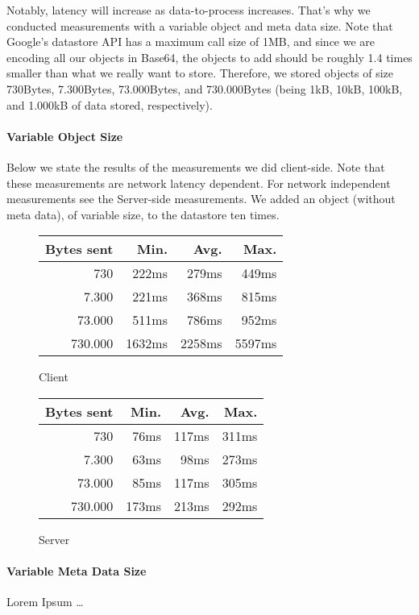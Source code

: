 Notably, latency will increase as data-to-process increases. That's why we
conducted measurements with a variable object and meta data size. Note that
Google's datastore API has a maximum call size of 1MB, and since we are
encoding all our objects in Base64, the objects to add should be roughly 1.4
times smaller than what we really want to store. Therefore, we stored objects 
of size 730Bytes, 7.300Bytes, 73.000Bytes, and 730.000Bytes (being 1kB, 10kB,
100kB, and 1.000kB of data stored, respectively).

\paragraph{Variable Object Size}
Below we state the results of the measurements we did client-side. Note that
these measurements are network latency dependent. For network independent
measurements see the Server-side measurements. We added an object (without meta
data), of variable size, to the datastore ten times.\newline

\begin{figure}
\begin{tabular}{|r|r|r|r|}
\hline
Bytes sent & Min. & Avg. & Max. \\
\hline
730 & 222ms & 279ms & 449ms \\
7.300 & 221ms & 368ms & 815ms \\
73.000 & 511ms & 786ms & 952ms \\ 
730.000 & 1632ms & 2258ms & 5597ms \\
\hline
\end{tabular}
\caption{Client}
\end{figure}

\begin{figure}
\begin{tabular}{|r|r|r|r|}
\hline
Bytes sent & Min. & Avg. & Max. \\
\hline
730 & 76ms & 117ms & 311ms \\
7.300 & 63ms & 98ms & 273ms \\
73.000 & 85ms & 117ms & 305ms \\
730.000 & 173ms & 213ms & 292ms \\
\hline
\end{tabular}
\caption{Server}
\end{figure}

\paragraph{Variable Meta Data Size}
Lorem Ipsum \ldots

